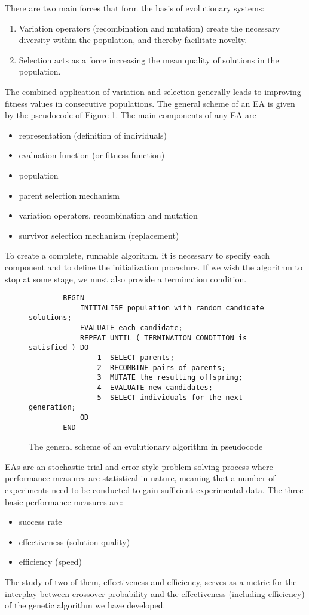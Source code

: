 \documentclass[10pt,a4paper]{article}
\begin{document}
There are two main forces that form the basis of evolutionary systems:
\begin{enumerate}
    \item Variation operators (recombination and mutation) create the necessary diversity within the population, and thereby facilitate novelty.
    \item Selection acts as a force increasing the mean quality of solutions in the population.
\end{enumerate}
The combined application of variation and selection generally leads to improving fitness values in consecutive populations. The general scheme of an EA is given by the pseudocode of Figure \ref{fig:EAscheme}. The main components of any EA are
\begin{itemize}
    \item representation (definition of individuals)
    \item evaluation function (or fitness function)
    \item population
    \item parent selection mechanism 
    \item variation operators, recombination and mutation
    \item survivor selection mechanism (replacement)
\end{itemize}
To create a complete, runnable algorithm, it is necessary to specify each component and to define the initialization procedure. If we wish the algorithm to stop at some stage, we must also provide a termination condition.
\begin{figure}[h!]
    \centering
    \begin{lstlisting}
        BEGIN
            INITIALISE population with random candidate solutions;
            EVALUATE each candidate;
            REPEAT UNTIL ( TERMINATION CONDITION is satisfied ) DO
                1  SELECT parents;
                2  RECOMBINE pairs of parents;
                3  MUTATE the resulting offspring;
                4  EVALUATE new candidates;
                5  SELECT individuals for the next generation;
            OD 
        END
    \end{lstlisting}
    \label{fig:EAscheme}
\caption{The general scheme of an evolutionary algorithm in pseudocode}
\end{figure}

EAs are an stochastic trial-and-error style problem solving process where performance measures are statistical in nature, meaning that a number of experiments need to be conducted to gain sufficient experimental data. The three basic performance measures are:
\begin{itemize}
    \item success rate 
    \item effectiveness (solution quality)
    \item efficiency (speed)
\end{itemize}
The study of two of them, effectiveness and efficiency, serves as a metric for the interplay between crossover probability and the effectiveness (including efficiency) of the genetic algorithm we have developed.
\end{document}
